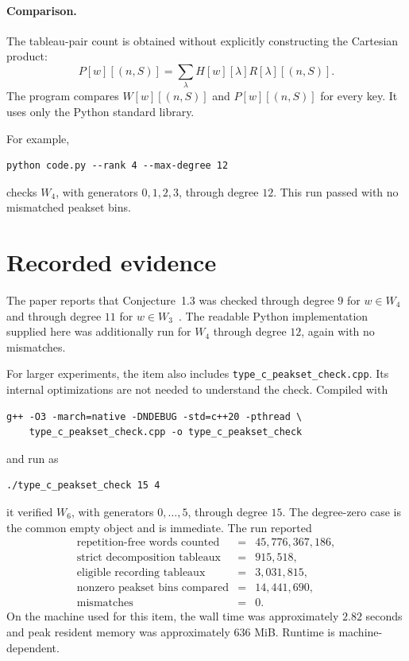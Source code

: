 \documentclass{article}
\begin{document}
\paragraph{Comparison.}
The tableau-pair count is obtained without explicitly constructing the
Cartesian product:
\[
  P[w][(n,S)]
  =\sum_\lambda H[w][\lambda]R[\lambda][(n,S)].
\]
The program compares \(W[w][(n,S)]\) and \(P[w][(n,S)]\) for every key.
It uses only the Python standard library.

For example,
\begin{verbatim}
python code.py --rank 4 --max-degree 12
\end{verbatim}
checks \(W_4\), with generators \(0,1,2,3\), through degree \(12\).
This run passed with no mismatched peakset bins.

\section{Recorded evidence}

The paper reports that Conjecture~1.3 was checked through degree \(9\) for
\(w\in W_4\) and through degree \(11\) for \(w\in W_3\)~\cite{AHHP}.
The readable Python implementation supplied here was additionally run for
\(W_4\) through degree \(12\), again with no mismatches.

For larger experiments, the item also includes
\texttt{type\_c\_peakset\_check.cpp}.  Its internal optimizations are not needed to
understand the check.  Compiled with
\begin{verbatim}
g++ -O3 -march=native -DNDEBUG -std=c++20 -pthread \
    type_c_peakset_check.cpp -o type_c_peakset_check
\end{verbatim}
and run as
\begin{verbatim}
./type_c_peakset_check 15 4
\end{verbatim}
it verified \(W_6\), with generators \(0,\ldots,5\), through degree \(15\).
The degree-zero case is the common empty object and is immediate.  The run
reported
\[
\begin{array}{rcl}
\text{repetition-free words counted} &=& 45{,}776{,}367{,}186,\\
\text{strict decomposition tableaux} &=& 915{,}518,\\
\text{eligible recording tableaux} &=& 3{,}031{,}815,\\
\text{nonzero peakset bins compared} &=& 14{,}441{,}690,\\
\text{mismatches} &=& 0.
\end{array}
\]
On the machine used for this item, the wall time was approximately
\(2.82\) seconds and peak resident memory was approximately \(636\) MiB.
Runtime is machine-dependent.
\end{document}
